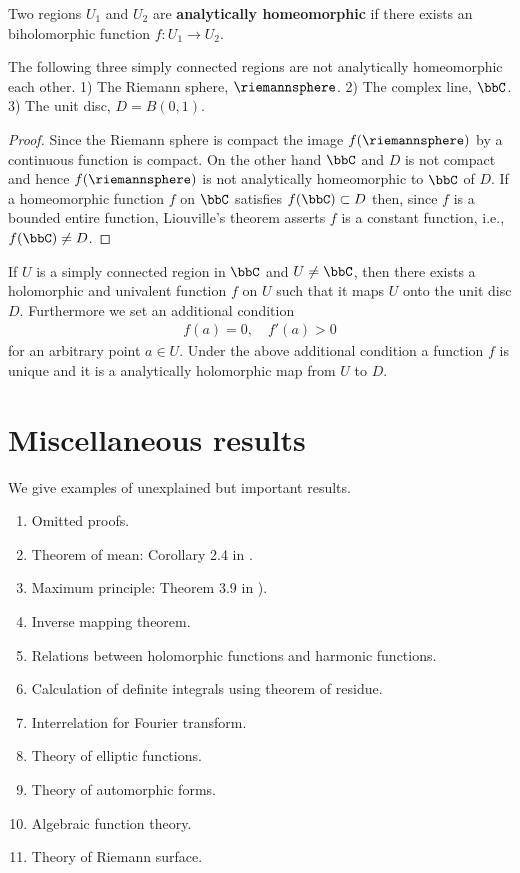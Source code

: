 \documentclass[openany, a4paper, oneside]{jsbook}
\begin{document}
\begin{defn}
 Two regions $U_1$ and $U_2$ are \textup{\textbf{analytically homeomorphic}} if
 there exists an biholomorphic function $f \colon U_1 \to U_2$.
\end{defn}
\begin{thm}
 The following three simply connected regions are not analytically homeomorphic each other.
 1) The Riemann sphere, $\riemannsphere$.
 2) The complex line, $\bbC$.
 3) The unit disc, $D = B (0, 1)$.
\end{thm}
\begin{proof}
Since the Riemann sphere is compact the image $f (\riemannsphere)$ by a continuous function is compact.
On the other hand $\bbC$ and $D$ is not compact and hence $f (\riemannsphere)$ is not
analytically homeomorphic to $\bbC$ of $D$.
If a homeomorphic function $f$ on $\bbC$ satisfies $f (\bbC) \subset D$ then,
since $f$ is a bounded entire function, Liouville's theorem asserts $f$ is a constant function,
i.e., $f (\bbC) \neq D$.
\end{proof}
\begin{thm}
 If $U$ is a simply connected region in $\bbC$ and $U \neq \bbC$, then
 there exists a holomorphic and univalent function $f$ on $U$ such that it maps $U$ onto the unit disc $D$.
 Furthermore we set an additional condition
 \begin{align}
  f (a) = 0, \quad f'(a) > 0
 \end{align}
 for an arbitrary point $a \in U$.
 Under the above additional condition a function $f$ is unique and it is a analytically holomorphic map from $U$ to $D$.
\end{thm}
\section{Miscellaneous results}

We give examples of unexplained but important results.
\begin{enumerate}
\item Omitted proofs.
\item Theorem of mean: Corollary 2.4 in \cite{MitsuoSugiura2}.
\item Maximum principle: Theorem 3.9 in \cite{MitsuoSugiura2}).
\item Inverse mapping theorem.
\item Relations between holomorphic functions and harmonic functions.
\item Calculation of definite integrals using theorem of residue.
\item Interrelation for Fourier transform.
\item Theory of elliptic functions.
\item Theory of automorphic forms.
\item Algebraic function theory.
\item Theory of Riemann surface.
\end{enumerate}
\end{document}
